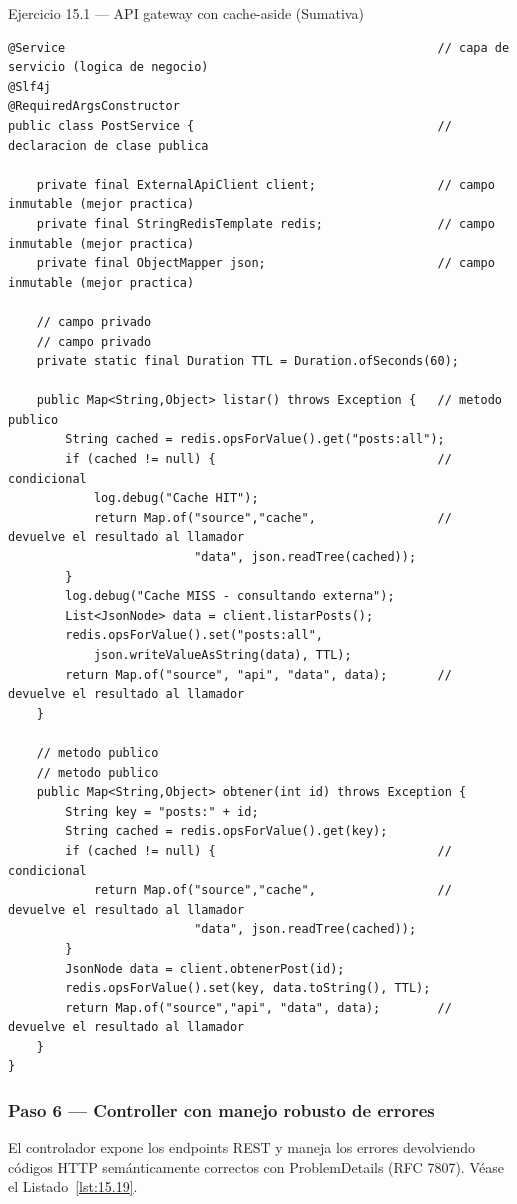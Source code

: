 \documentclass[11pt,a4paper,openany]{book}
\begin{document}
\begin{cajaejercicio}{Ejercicio 15.1 --- API gateway con cache-aside (Sumativa)}
\begin{lstlisting}[style=java,caption={PostService.java},label=lst:15.18]
@Service                                                    // capa de servicio (logica de negocio)
@Slf4j
@RequiredArgsConstructor
public class PostService {                                  // declaracion de clase publica

    private final ExternalApiClient client;                 // campo inmutable (mejor practica)
    private final StringRedisTemplate redis;                // campo inmutable (mejor practica)
    private final ObjectMapper json;                        // campo inmutable (mejor practica)

    // campo privado
    // campo privado
    private static final Duration TTL = Duration.ofSeconds(60);

    public Map<String,Object> listar() throws Exception {   // metodo publico
        String cached = redis.opsForValue().get("posts:all");
        if (cached != null) {                               // condicional
            log.debug("Cache HIT");
            return Map.of("source","cache",                 // devuelve el resultado al llamador
                          "data", json.readTree(cached));
        }
        log.debug("Cache MISS - consultando externa");
        List<JsonNode> data = client.listarPosts();
        redis.opsForValue().set("posts:all",
            json.writeValueAsString(data), TTL);
        return Map.of("source", "api", "data", data);       // devuelve el resultado al llamador
    }

    // metodo publico
    // metodo publico
    public Map<String,Object> obtener(int id) throws Exception {
        String key = "posts:" + id;
        String cached = redis.opsForValue().get(key);
        if (cached != null) {                               // condicional
            return Map.of("source","cache",                 // devuelve el resultado al llamador
                          "data", json.readTree(cached));
        }
        JsonNode data = client.obtenerPost(id);
        redis.opsForValue().set(key, data.toString(), TTL);
        return Map.of("source","api", "data", data);        // devuelve el resultado al llamador
    }
}
\end{lstlisting}

\subsubsection*{Paso 6 --- Controller con manejo robusto de errores}

El controlador expone los endpoints REST y maneja los
errores devolviendo códigos HTTP semánticamente correctos con
ProblemDetails (RFC 7807). V\'ease el Listado~\ref{lst:15.19}.



\end{cajaejercicio}
\end{document}
